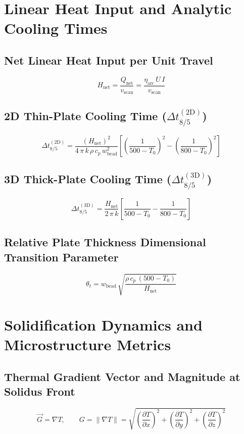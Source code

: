 \documentclass[10pt,a4paper]{article}
\begin{document}
\clearpage
\section{Linear Heat Input and Analytic Cooling Times}

\subsection*{Net Linear Heat Input per Unit Travel}
\[
H_{\mathrm{net}} = \frac{Q_{\mathrm{net}}}{v_{\mathrm{scan}}} = \frac{\eta_{\mathrm{arc}}\,U\,I}{v_{\mathrm{scan}}}
\]

\subsection*{2D Thin-Plate Cooling Time ($\Delta t_{8/5}^{(2\mathrm{D})}$)}
\[
\Delta t_{8/5}^{(2\mathrm{D})} = \frac{(H_{\mathrm{net}})^2}{4\,\pi\,k\,\rho\,c_p\,w_{\mathrm{bead}}^2}\left[\left(\frac{1}{500 - T_0}\right)^2 - \left(\frac{1}{800 - T_0}\right)^2\right]
\]

\subsection*{3D Thick-Plate Cooling Time ($\Delta t_{8/5}^{(3\mathrm{D})}$)}
\[
\Delta t_{8/5}^{(3\mathrm{D})} = \frac{H_{\mathrm{net}}}{2\,\pi\,k}\left[\frac{1}{500 - T_0} - \frac{1}{800 - T_0}\right]
\]

\subsection*{Relative Plate Thickness Dimensional Transition Parameter}
\[
\theta_t = w_{\mathrm{bead}}\,\sqrt{\frac{\rho\,c_p\,(500 - T_0)}{H_{\mathrm{net}}}}
\]

\clearpage
\section{Solidification Dynamics and Microstructure Metrics}

\subsection*{Thermal Gradient Vector and Magnitude at Solidus Front}
\[
\vec{G} = \nabla T, \qquad G = \|\nabla T\| = \sqrt{\left(\frac{\partial T}{\partial x}\right)^2 + \left(\frac{\partial T}{\partial y}\right)^2 + \left(\frac{\partial T}{\partial z}\right)^2}
\]
\end{document}
